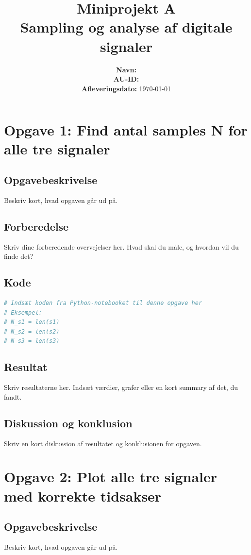 ﻿\documentclass[11pt,a4paper]{report}
\title{\vspace{1cm}\Huge Miniprojekt A\\[0.3cm]\Large Sampling og analyse af digitale signaler}
\author{\textbf{Navn:} \\ \textbf{AU-ID:} \\ \textbf{Afleveringsdato:} \today}
\date{}
\begin{document}
\maketitle

\section{Opgave 1: Find antal samples N for alle tre signaler}
\subsection{Opgavebeskrivelse}
Beskriv kort, hvad opgaven går ud på.

\subsection{Forberedelse}
Skriv dine forberedende overvejelser her. Hvad skal du måle, og hvordan vil du finde det?

\subsection{Kode}
\begin{lstlisting}[language=Python]
# Indsæt koden fra Python-notebooket til denne opgave her
# Eksempel:
# N_s1 = len(s1)
# N_s2 = len(s2)
# N_s3 = len(s3)
\end{lstlisting}

\subsection{Resultat}
Skriv resultaterne her. Indsæt værdier, grafer eller en kort summary af det, du fandt.

\subsection{Diskussion og konklusion}
Skriv en kort diskussion af resultatet og konklusionen for opgaven.

\newpage

\section{Opgave 2: Plot alle tre signaler med korrekte tidsakser}
\subsection{Opgavebeskrivelse}
Beskriv kort, hvad opgaven går ud på.
\end{document}
